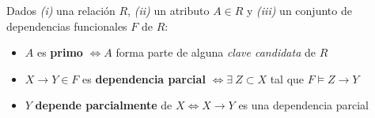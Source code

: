 \documentclass[preview]{standalone}
\begin{document}
Dados {\em (i)} una relaci\'on $R$, {\em (ii)} un atributo $A\in R$ y {\em (iii)} un conjunto de dependencias funcionales $F$ de $R$: 


\begin{itemize}
\item $A$ es \textbf{primo} $\Leftrightarrow A$ forma parte de alguna {\em clave candidata} de $R$
\item $X \rightarrow Y\in F$ es \textbf{dependencia parcial} $\Leftrightarrow \exists \ Z \subset X$ tal que $F \models Z\rightarrow Y$
\item $Y$ \textbf{depende parcialmente} de $X \Leftrightarrow X \rightarrow Y$ es una dependencia parcial
\end{itemize}
\end{document}
